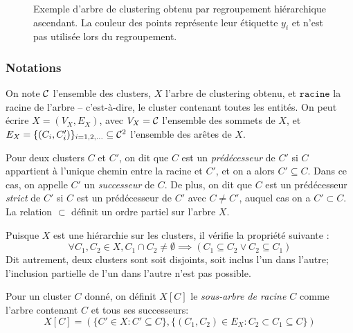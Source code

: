 \begin{figure}[h]
    \centering
    \begin{adjustwidth}{0in}{-0.5in}
     \resizebox{1.1\textwidth}{!}{%
         
     }%
    \end{adjustwidth}
    \caption[Principe du regroupement hiérarchique ascendant]{Exemple d'arbre de clustering obtenu par regroupement hiérarchique ascendant. La couleur des points représente leur étiquette $y_i$ et n'est pas utilisée lors du regroupement.}
    \label{fig:clustering_tree}
\end{figure}

\subsubsection{Notations}

On note $\mathcal{C}$ l'ensemble des clusters, $X$ l'arbre de clustering obtenu, et $\texttt{racine}$ la racine de l'arbre – c'est-à-dire, le cluster contenant toutes les entités. On peut écrire $X = (V_X, E_X)$, avec $V_X = \mathcal{C}$ l'ensemble des sommets de $X$, et $E_X = \{(C_i, C_i')\}_{i = 1, 2, \ldots } \subseteq \mathcal{C}^2$ l'ensemble des arêtes de $X$.

Pour deux clusters $C$ et $C'$, on dit que $C$ est un \textit{prédécesseur} de $C'$ si $C$ appartient à l'unique chemin entre la racine et $C'$, et on a alors $C' \subseteq C$. Dans ce cas, on appelle $C'$ un \textit{successeur} de $C$. De plus, on dit que $C$ est un prédécesseur \textit{strict} de $C'$ si $C$ est un prédécesseur de $C'$ avec $C \neq C'$, auquel cas on a $C' \subset C$. La relation $\subset$ définit un ordre partiel sur l'arbre $X$.

Puisque $X$ est une hiérarchie sur les clusters, il vérifie la propriété suivante :
\begin{equation}
    \forall C_1, C_2 \in X, C_1 \cap C_2 \neq \emptyset \implies (C_1 \subseteq C_2 \lor C_2 \subseteq C_1)
\end{equation}
Dit autrement, deux clusters sont soit disjoints, soit inclus l'un dans l'autre; l'inclusion partielle de l'un dans l'autre n'est pas possible.

Pour un cluster $C$ donné, on définit $X[C]$ le \textit{sous-arbre de racine $C$} comme l'arbre contenant $C$ et tous ses successeurs:
\begin{equation}
    X[C] = (\{C' \in X : C' \subseteq C\}, \{(C_1, C_2) \in E_X : C_2 \subset C_1 \subseteq C\})
\end{equation}

